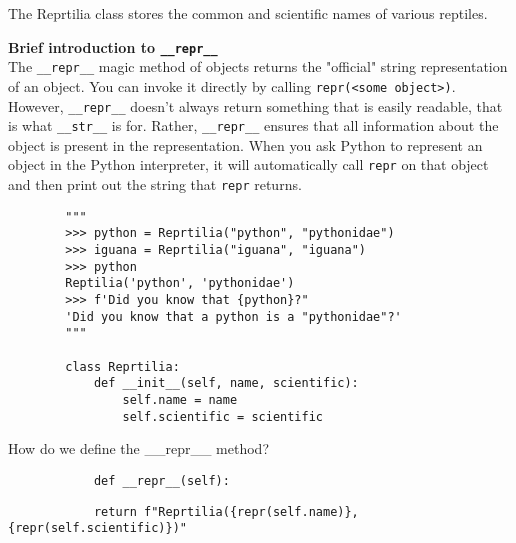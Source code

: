 \begin{blocksection}
    \question The Reprtilia class stores the common and scientific names of various reptiles.
    
    \textbf{Brief introduction to \lstinline{__repr__}} \\ The \lstinline{__repr__} magic method of objects returns the "official" string representation of an object. You can invoke it directly by calling \lstinline{repr(<some object>)}. However, \lstinline{__repr__} doesn't always return something that is easily readable, that is what \lstinline{__str__} is for. Rather, \lstinline{__repr__} ensures that all information about the object is present in the representation. When you ask Python to represent an object in the Python interpreter, it will automatically call \lstinline{repr} on that object and then print out the string that \lstinline{repr} returns.
    
    \vspace{1.5\baselineskip}
    
    \begin{lstlisting}
        """
        >>> python = Reprtilia("python", "pythonidae")
        >>> iguana = Reprtilia("iguana", "iguana")
        >>> python
        Reptilia('python', 'pythonidae')
        >>> f'Did you know that {python}?"
        'Did you know that a python is a "pythonidae"?'
        """
    
        class Reprtilia:
            def __init__(self, name, scientific):
                self.name = name
                self.scientific = scientific
    \end{lstlisting}
\end{blocksection}
    
\begin{blocksection}
    \question How do we define the __repr__ method?

    \vspace{1.5\baselineskip}
    
    \begin{lstlisting}
            def __repr__(self):
    \end{lstlisting}
    \begin{solution}[0.25in]
    \begin{lstlisting}
            return f"Reprtilia({repr(self.name)}, {repr(self.scientific)})"
    \end{lstlisting}
    \end{solution}
\end{blocksection}

